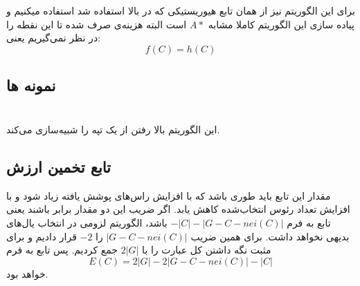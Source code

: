 \section{}
برای این الگوریتم
 نیز از همان تابع هیوریستیکی که در بالا استفاده شد استفاده میکنیم و پیاده سازی این الگوریتم کاملا مشابه 
$A*$
است البته هزینه‌ی صرف شده تا این نقطه را در نظر نمی‌گیریم یعنی:
\begin{equation}
\label{e04}
f(C)=h(C)
\end{equation}


\subsection{نمونه ها}




\section{}
این الگوریتم
 بالا رفتن از یک تپه را شبیه‌سازی می‌کند.
\subsection{تابع تخمین ارزش}
مقدار این تابع باید طوری باشد که با افزایش راس‌های پوشش یافته زیاد شود و با افزایش تعداد رئوس انتخاب‌شده کاهش یابد.
اگر ضریب این دو مقدار برابر باشند یعنی تابع به فرم
$-|C| -|G - C - nei(C)| $
باشد، الگوریتم لزومی در انتخاب یال‌های بدیهی نخواهد داشت.
برای همین ضریب 
$|G - C - nei(C)|$
را 
$-2$
قرار دادیم و برای مثبت نگه داشتن کل عبارت را با
$2|G|$
جمع کردیم.
پس تابع به فرم
\begin{equation}
\label{e01}
E(C) = 2 |G| - 2 |G - C - nei(C)| - |C|
\end{equation}
خواهد بود.
